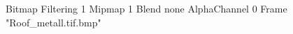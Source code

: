 {Bitmap
	{Filtering 1}
	{Mipmap 1}
	{Blend none}
	{AlphaChannel 0}
	{Frame "Roof_metall.tif.bmp"}
}
